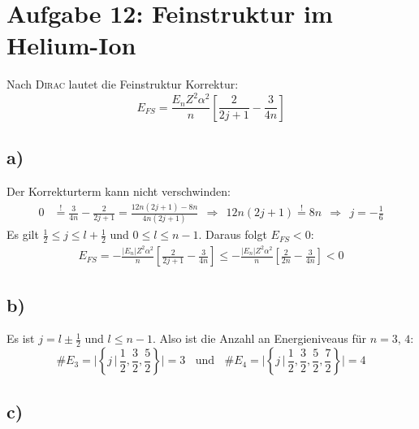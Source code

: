\documentclass[a4paper,12pt]{article}
\newcommand{\klam}{}
\newcommand{\klammer}{}
\begin{document}
\section*{Aufgabe 12: Feinstruktur im Helium-Ion}
Nach \textsc{Dirac} lautet die Feinstruktur Korrektur:
$$E_{FS}=\frac{E_nZ^2\alpha^2}{n}\klam\left[ {\frac{2}{2j+1}-\frac{3}{4n}} \right]$$
\subsection*{a) }
Der Korrekturterm kann nicht verschwinden:
\begin{align*}
0&\overset{!}{=}\frac{3}{4n}-\frac{2}{2j+1}=\frac{12n(2j+1)-8n}{4n(2j+1)}\ \ \Rightarrow\ \ 12n(2j+1)\overset{!}{=}8n\ \ \Rightarrow\ \ j=-\frac{1}{6} 
\end{align*}
Es gilt $\frac{1}{2}\le j\le l+\frac{1}{2}$ und $0\le l\le n-1$. Daraus folgt $E_{FS}<0$:
\begin{align*}
E_{FS}=-\frac{|E_n|Z^2\alpha^2}{n}\klam\left[ {\frac{2}{2j+1}-\frac{3}{4n}} \right]\le -\frac{|E_n|Z^2\alpha^2}{n}\klam\left[ {\frac{2}{2n}-\frac{3}{4n}} \right]< 0
\end{align*}
\subsection*{b) }
Es ist $j=l\pm\frac{1}{2}$ und $l\le n-1$. Also ist die Anzahl an Energieniveaus für $n=3,\, 4$:
$$\# E_3 = \Big |\klammer\left\{ {j\,\Big|\, \frac{1}{2},\frac{3}{2},\frac{5}{2}} \right\}\Big |=3\ \ \ \ \mathrm{und}\ \ \ \ \# E_4=\Big|\klammer\left\{ {j\,\Big|\, \frac{1}{2},\frac{3}{2},\frac{5}{2},\frac{7}{2}} \right\}\Big|=4 $$

\subsection*{c) }
\end{document}
